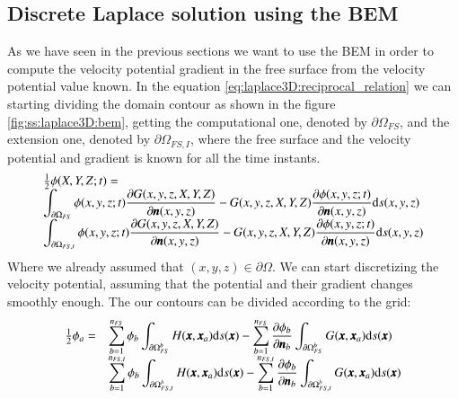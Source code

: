 \subsection{Discrete Laplace solution using the BEM}
\label{sss:laplace3D:bem_solve}
%
As we have seen in the previous sections we want to use the BEM in order
to compute the velocity potential gradient in the free surface from the
velocity potential value known. In the equation
\ref{eq:laplace3D:reciprocal_relation} we can starting dividing the domain
contour as shown in the figure \ref{fig:ss:laplace3D:bem}, getting the
computational one, denoted by $\partial \Omega_{FS}$, and
the extension one, denoted by $\partial \Omega_{FS,I}$, where the free
surface and the velocity potential and gradient is known for all the
time instants.
%
\begin{eqnarray}
	\label{eq:laplace3D:reciprocal_relation:002}
	\begin{array}{l}
	\frac{1}{2} \phi(X, Y, Z; t) =
	\\
	\dsty \int_{\partial \Omega_{FS}}
		\phi(x, y, z; t) \frac{\partial G(x, y, z, X, Y, Z)}{\partial \bs{n}(x, y, z)} -
		G(x, y, z, X, Y, Z) \frac{\partial \phi(x, y, z; t)}{\partial \bs{n}(x, y, z)}
		\mbox{d} s(x, y, z)
	\\
	\dsty \int_{\partial \Omega_{FS,I}}
		\phi(x, y, z; t) \frac{\partial G(x, y, z, X, Y, Z)}{\partial \bs{n}(x, y, z)} -
		G(x, y, z, X, Y, Z) \frac{\partial \phi(x, y, z; t)}{\partial \bs{n}(x, y, z)}
		\mbox{d} s(x, y, z)		
	\end{array}
\end{eqnarray}
%
Where we already assumed that $(x,y,z) \in \partial \Omega$. We can start discretizing
the velocity potential, assuming that the potential and their gradient changes smoothly
enough. The our contours can be divided according to the grid:
%
\begin{eqnarray}
	\label{eq:laplace3D:reciprocal_relation:003}
	\begin{array}{rl}
	\frac{1}{2} \phi_a = &
	\dsty \sum_{b=1}^{n_{FS}}
		\phi_b
		\dsty \int_{\partial \Omega_{FS}^b} H(\bs{x}, \bs{x}_a) \mbox{d} s(\bs{x})
	-
	\dsty \sum_{b=1}^{n_{FS}}
		\frac{\partial \phi_b}{\partial \bs{n}_b}
		\dsty \int_{\partial \Omega_{FS}^b} G(\bs{x}, \bs{x}_a) \mbox{d} s(\bs{x})
	\\
	&
	\dsty \sum_{b=1}^{n_{FS,I}}
		\phi_b
		\dsty \int_{\partial \Omega_{FS,I}^b} H(\bs{x}, \bs{x}_a) \mbox{d} s(\bs{x})
	-
	\dsty \sum_{b=1}^{n_{FS,I}}
		\frac{\partial \phi_b}{\partial \bs{n}_b}
		\dsty \int_{\partial \Omega_{FS,I}^b} G(\bs{x}, \bs{x}_a) \mbox{d} s(\bs{x})
	\end{array}
\end{eqnarray}
